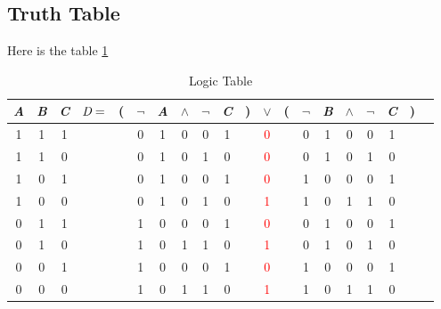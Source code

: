\documentclass{scrartcl}
\begin{document}
\subsection{Truth Table}
Here is the table \ref{tab:IDK}
\noindent
\FloatBarrier
\begin{table}[ht]
	\centering
	\caption{Logic Table}
	\begin{tabular}{@{ }c@{ }@{ }c@{ }@{ }c | c@{ }@{}c@{}@{ }c@{ }@{ }c@{ }@{ }c@{ }@{ }c@{ }@{ }c@{ }@{}c@{}@{ }c@{ }@{}c@{}@{ }c@{ }@{ }c@{ }@{ }c@{ }@{ }c@{ }@{ }c@{ }@{}c@{}@{ }c}
		\emph{A} & \emph{B} & \emph{C} & $\emph{D}=$ & ( & $\lnot$ & \emph{A} & $\land$ & $\lnot$ & \emph{C} & ) & $\lor$             & ( & $\lnot$ & \emph{B} & $\land$ & $\lnot$ & \emph{C} & ) & \\
		\hline
		1        & 1        & 1        &             &   & 0       & 1        & 0       & 0       & 1        &   & \textcolor{red}{0} &   & 0       & 1        & 0       & 0       & 1        &   & \\
		1        & 1        & 0        &             &   & 0       & 1        & 0       & 1       & 0        &   & \textcolor{red}{0} &   & 0       & 1        & 0       & 1       & 0        &   & \\
		1        & 0        & 1        &             &   & 0       & 1        & 0       & 0       & 1        &   & \textcolor{red}{0} &   & 1       & 0        & 0       & 0       & 1        &   & \\
		1        & 0        & 0        &             &   & 0       & 1        & 0       & 1       & 0        &   & \textcolor{red}{1} &   & 1       & 0        & 1       & 1       & 0        &   & \\
		0        & 1        & 1        &             &   & 1       & 0        & 0       & 0       & 1        &   & \textcolor{red}{0} &   & 0       & 1        & 0       & 0       & 1        &   & \\
		0        & 1        & 0        &             &   & 1       & 0        & 1       & 1       & 0        &   & \textcolor{red}{1} &   & 0       & 1        & 0       & 1       & 0        &   & \\
		0        & 0        & 1        &             &   & 1       & 0        & 0       & 0       & 1        &   & \textcolor{red}{0} &   & 1       & 0        & 0       & 0       & 1        &   & \\
		0        & 0        & 0        &             &   & 1       & 0        & 1       & 1       & 0        &   & \textcolor{red}{1} &   & 1       & 0        & 1       & 1       & 0        &   & \\
	\end{tabular}
	\label{tab:IDK}
\end{table}
\FloatBarrier
\end{document}
